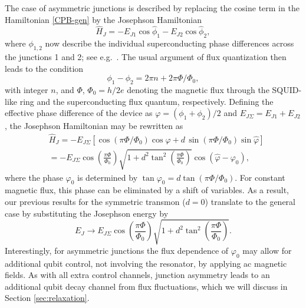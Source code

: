 \documentclass[twocolumn,amsmath,amssymb,floatfix,pra,showpacs,eqsecnum,footinbib,superscriptaddress]{revtex4}
\newcommand{\be}{\begin{equation}}
\newcommand{\ee}{\end{equation}}
\begin{document}
The case of asymmetric junctions is described by replacing the cosine term in the Hamiltonian \eqref{CPB-gen} by the Josephson Hamiltonian
\be
\hat{H}_J=-E_{J1} \cos \hat{\phi}_1 -E_{J2} \cos \hat{\phi}_2,
\ee
where $\phi_{1,2}$ now describe the individual superconducting phase differences across the junctions 1 and 2; see e.g.\ \cite{tinkham}. The usual argument of flux quantization then leads to the condition 
\be
\phi_1-\phi_2 = 2\pi n + 2\pi\Phi/\Phi_0,
\ee
with integer $n$, and $\Phi$, $\Phi_0=h/2e$ denoting the magnetic flux through the SQUID-like ring and the superconducting flux quantum, respectively.  Defining the effective phase difference of the device as $\varphi=(\phi_1+\phi_2)/2$ and $E_{J\Sigma}=E_{J1}+E_{J2}$, the Josephson Hamiltonian may be rewritten as
\begin{align}
&\hat{H}_J=-E_{J\Sigma}\left[  \cos(\pi\Phi/\Phi_0) \cos \hat{\varphi} + d\, \sin (\pi\Phi/\Phi_0)  \sin \hat{\varphi}\right]\nonumber\\
&=-E_{J\Sigma}\cos \left(\frac{\pi\Phi}{\Phi_0}\right)\sqrt{1+d^2 \tan^2 \left(\frac{\pi\Phi}{\Phi_0}\right)}\cos(\hat{\varphi}-\varphi_0),
\label{josham}
\end{align}
where the phase $\varphi_0$ is determined by $\tan \varphi_0=d\tan (\pi\Phi/\Phi_0)$. For constant magnetic flux, this phase can be eliminated by a shift of variables. As a result, our previous results for the symmetric transmon ($d=0$) translate to the general case by substituting the Josephson energy by
\be
E_J \to E_{J\Sigma}\cos \left(\frac{\pi\Phi}{\Phi_0}\right)\sqrt{1+d^2 \tan^2 \left(\frac{\pi\Phi}{\Phi_0}\right)}.
\ee
Interestingly, for asymmetric junctions the flux dependence of $\varphi_0$ may allow for additional qubit control, not involving the resonator, by applying ac magnetic fields. As with all extra control channels, junction asymmetry leads to an additional qubit decay channel from flux fluctuations, which we will discuss in Section \ref{sec:relaxation}.
\end{document}
